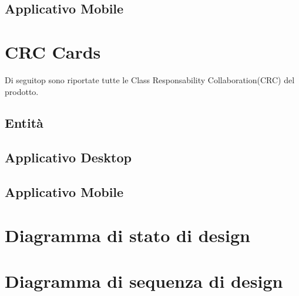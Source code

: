 \subsection{Applicativo Mobile}
\section{CRC  Cards}
Di seguitop sono riportate tutte le Class Responsability Collaboration(CRC) del prodotto.

\subsection{Entità}
    
     
    
    
\subsection{Applicativo Desktop}
    
    
    
    
    
    
    
    
    
    
    
    
\subsection{Applicativo Mobile}
    
    
    
    
    
\section{Diagramma di stato di design}

\section{Diagramma di sequenza di design}